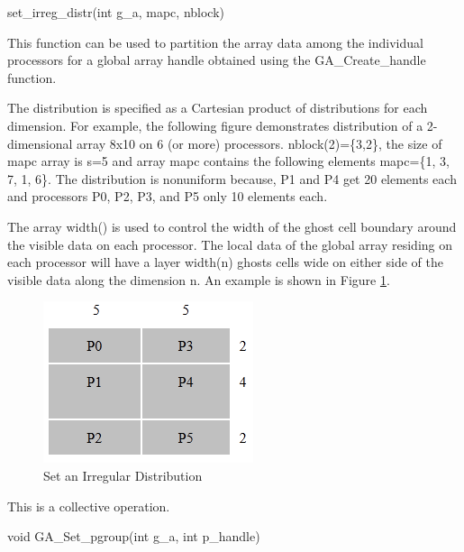 \documentclass[12pt]{article}
\begin{document}
\begin{pyapi}
\begin{pycode}
set_irreg_distr(int g_a, mapc, nblock)
\end{pycode}
\end{pyapi}
\gcoll

\begin{desc}

  This function can be used to partition the array data among the
  individual processors for a global array handle obtained using the
  GA_Create_handle function.

  The distribution is specified as a Cartesian product of
  distributions for each dimension. For example, the following figure
  demonstrates distribution of a 2-dimensional array 8x10 on 6 (or
  more) processors. nblock(2)=\{3,2\}, the size of mapc array is s=5 and
  array mapc contains the following elements mapc=\{1, 3, 7, 1, 6\}. The
  distribution is nonuniform because, P1 and P4 get 20 elements each
  and processors P0, P2, P3, and P5 only 10 elements each.

  The array width() is used to control the width of the ghost cell
  boundary around the visible data on each processor. The local data
  of the global array residing on each processor will have a layer
  width(n) ghosts cells wide on either side of the visible data along
  the dimension n.
An example is shown in Figure \ref{setirregdist}.

\begin{figure}
\centering
\includegraphics{SetIrregDist}
\caption{Set an Irregular Distribution}
\label{setirregdist}
\end{figure}

  This is a collective operation.

\end{desc}


\begin{capi}
\begin{ccode}
void GA_Set_pgroup(int g_a, int p_handle)
\end{ccode}
\begin{funcargs}
\end{funcargs}
\end{capi}
\end{document}
